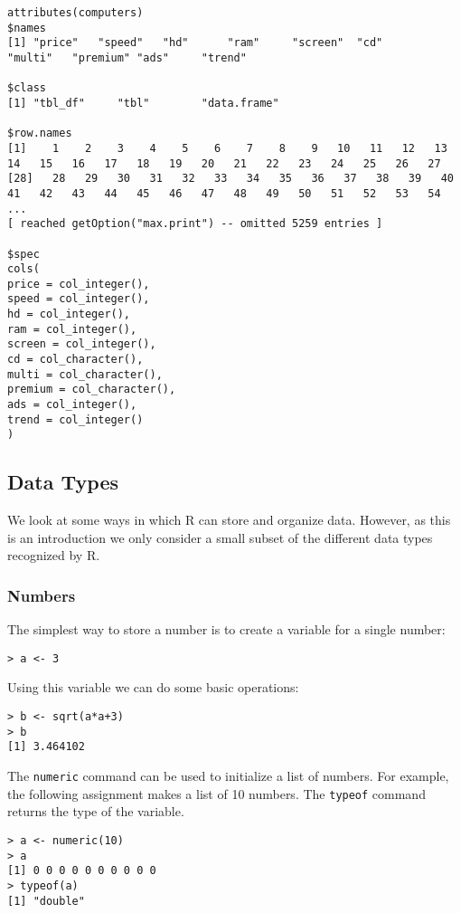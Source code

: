 \begin{lstlisting}[breaklines=true]
attributes(computers)
$names
[1] "price"   "speed"   "hd"      "ram"     "screen"  "cd"      "multi"   "premium" "ads"     "trend"  

$class
[1] "tbl_df"     "tbl"        "data.frame"

$row.names
[1]    1    2    3    4    5    6    7    8    9   10   11   12   13   14   15   16   17   18   19   20   21   22   23   24   25   26   27
[28]   28   29   30   31   32   33   34   35   36   37   38   39   40   41   42   43   44   45   46   47   48   49   50   51   52   53   54
...
[ reached getOption("max.print") -- omitted 5259 entries ]

$spec
cols(
price = col_integer(),
speed = col_integer(),
hd = col_integer(),
ram = col_integer(),
screen = col_integer(),
cd = col_character(),
multi = col_character(),
premium = col_character(),
ads = col_integer(),
trend = col_integer()
)

\end{lstlisting}

\subsection{Data Types}

We look at some ways in which R can store and organize data. 
However, as this is an introduction we only consider a small subset of the different data types recognized by R.

\subsubsection{Numbers}

The simplest way to store a number is to create a variable for a single number:
\begin{lstlisting}
> a <- 3
\end{lstlisting}

Using this variable we can do some basic operations:
\begin{lstlisting}
> b <- sqrt(a*a+3)
> b
[1] 3.464102
\end{lstlisting}

The \texttt{numeric} command can be used to initialize a list of numbers. For example, the following assignment makes a list of 10 numbers. The \texttt{typeof} command returns the type of the variable.
\begin{lstlisting}
> a <- numeric(10)
> a
[1] 0 0 0 0 0 0 0 0 0 0
> typeof(a)
[1] "double"
\end{lstlisting}

